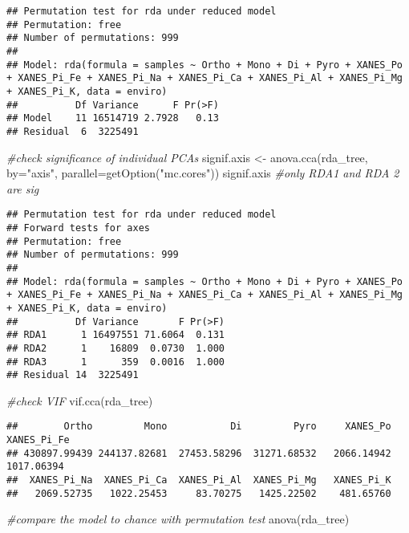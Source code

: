 \documentclass[
]{article}
\newenvironment{Shaded}{\begin{snugshade}}{\end{snugshade}}
\newcommand{\AttributeTok}[1]{\textcolor[rgb]{0.77,0.63,0.00}{#1}}
\newcommand{\CommentTok}[1]{\textcolor[rgb]{0.56,0.35,0.01}{\textit{#1}}}
\newcommand{\FunctionTok}[1]{\textcolor[rgb]{0.00,0.00,0.00}{#1}}
\newcommand{\NormalTok}[1]{#1}
\newcommand{\OtherTok}[1]{\textcolor[rgb]{0.56,0.35,0.01}{#1}}
\newcommand{\StringTok}[1]{\textcolor[rgb]{0.31,0.60,0.02}{#1}}
\begin{document}
\begin{verbatim}
## Permutation test for rda under reduced model
## Permutation: free
## Number of permutations: 999
## 
## Model: rda(formula = samples ~ Ortho + Mono + Di + Pyro + XANES_Po + XANES_Pi_Fe + XANES_Pi_Na + XANES_Pi_Ca + XANES_Pi_Al + XANES_Pi_Mg + XANES_Pi_K, data = enviro)
##          Df Variance      F Pr(>F)
## Model    11 16514719 2.7928   0.13
## Residual  6  3225491
\end{verbatim}

\begin{Shaded}
\begin{Highlighting}[]
\CommentTok{\#check significance of individual PCAs}
\NormalTok{signif.axis }\OtherTok{\textless{}{-}} \FunctionTok{anova.cca}\NormalTok{(rda\_tree, }\AttributeTok{by=}\StringTok{"axis"}\NormalTok{, }\AttributeTok{parallel=}\FunctionTok{getOption}\NormalTok{(}\StringTok{"mc.cores"}\NormalTok{))}
\NormalTok{signif.axis }\CommentTok{\#only RDA1 and RDA 2 are sig}
\end{Highlighting}
\end{Shaded}

\begin{verbatim}
## Permutation test for rda under reduced model
## Forward tests for axes
## Permutation: free
## Number of permutations: 999
## 
## Model: rda(formula = samples ~ Ortho + Mono + Di + Pyro + XANES_Po + XANES_Pi_Fe + XANES_Pi_Na + XANES_Pi_Ca + XANES_Pi_Al + XANES_Pi_Mg + XANES_Pi_K, data = enviro)
##          Df Variance       F Pr(>F)
## RDA1      1 16497551 71.6064  0.131
## RDA2      1    16809  0.0730  1.000
## RDA3      1      359  0.0016  1.000
## Residual 14  3225491
\end{verbatim}

\begin{Shaded}
\begin{Highlighting}[]
\CommentTok{\#check VIF}
\FunctionTok{vif.cca}\NormalTok{(rda\_tree)}
\end{Highlighting}
\end{Shaded}

\begin{verbatim}
##        Ortho         Mono           Di         Pyro     XANES_Po  XANES_Pi_Fe 
## 430897.99439 244137.82681  27453.58296  31271.68532   2066.14942   1017.06394 
##  XANES_Pi_Na  XANES_Pi_Ca  XANES_Pi_Al  XANES_Pi_Mg   XANES_Pi_K 
##   2069.52735   1022.25453     83.70275   1425.22502    481.65760
\end{verbatim}

\begin{Shaded}
\begin{Highlighting}[]
\CommentTok{\#compare the model to chance with permutation test}
\FunctionTok{anova}\NormalTok{(rda\_tree)}
\end{Highlighting}
\end{Shaded}
\end{document}
